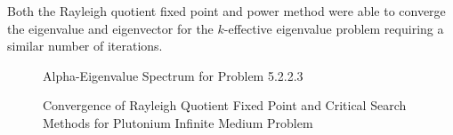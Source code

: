Both the Rayleigh quotient fixed point and power method were able to converge the eigenvalue and eigenvector for the $k$-effective eigenvalue problem requiring a similar number of iterations. 

\begin{figure}
\centering
	\resizebox{0.75\textwidth}{!}{
	}
\caption{Alpha-Eigenvalue Spectrum for Problem 5.2.2.3}
\label{fig:G81P3Spec}
\end{figure}

\begin{table}[H]
    \centering
    \caption{Transport Sweeps for Convergence for Problem 5.2.2.3}
\label{table:G81c}
\end{table}

\begin{figure}[H]
	\centering
	\resizebox{!}{0.5\textheight}{
		
	}
	\caption{Convergence of Rayleigh Quotient Fixed Point and Critical Search Methods for Plutonium Infinite Medium Problem}
\end{figure}



\label{sec:Res}


